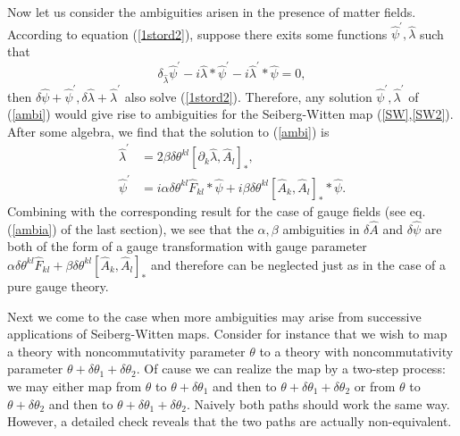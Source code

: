 \documentclass[a4paper,a4paper]{article}%
\begin{document}
Now let us consider the ambiguities arisen in the presence of matter fields.
According to equation (\ref{1stord2}), suppose there exits some functions
$\hat{\psi}^{\prime},\hat{\lambda}$ such that
\begin{equation}
\delta_{\hat{\lambda}}\hat{\psi}^{\prime}-i\hat{\lambda}\ast\hat{\psi}%
^{\prime}-i\hat{\lambda}^{\prime}\ast\hat{\psi}=0, \label{ambi}%
\end{equation}
then $\delta\hat{\psi}+\hat{\psi}^{\prime},\delta\hat{\lambda}+\hat{\lambda
}^{\prime}$ also solve (\ref{1stord2}). Therefore, any solution $\hat{\psi
}^{\prime},\hat{\lambda}^{\prime}$ of (\ref{ambi}) would give rise to
ambiguities for the Seiberg-Witten map (\ref{SW},\ref{SW2}). After some
algebra, we find that the solution to (\ref{ambi}) is%
\begin{align*}
\hat{\lambda}^{\prime}  &  =2\beta\delta\theta^{kl}[\partial_{k}\hat{\lambda
},\hat{A}_{l}]_{\ast},\\
\hat{\psi}^{\prime}  &  =i\alpha\delta\theta^{kl}\hat{F}_{kl}\ast\hat{\psi
}+i\beta\delta\theta^{kl}[\hat{A}_{k},\hat{A}_{l}]_{\ast}\ast\hat{\psi}.
\end{align*}
Combining with the corresponding result for the case of gauge fields (see eq.
(\ref{ambia}) of the last section), we see that the $\alpha,\beta$ ambiguities
in $\delta\hat{A}$ and $\delta\hat{\psi}$ are both of the form of a gauge
transformation with gauge parameter $\alpha\delta\theta^{kl}\hat{F}_{kl}%
+\beta\delta\theta^{kl}[\hat{A}_{k},\hat{A}_{l}]_{\ast}$ and therefore can be
neglected just as in the case of a pure gauge theory.

Next we come to the case when more ambiguities may arise from successive
applications of Seiberg-Witten maps. Consider for instance that we wish to map
a theory with noncommutativity parameter $\theta$ to a theory with
noncommutativity parameter $\theta+\delta\theta_{1}+\delta\theta_{2}$. Of
cause we can realize the map by a two-step process: we may either map from
$\theta$ to $\theta+\delta\theta_{1}$ and then to $\theta+\delta\theta
_{1}+\delta\theta_{2}$ or from $\theta$ to $\theta+\delta\theta_{2}$ and then
to $\theta+\delta\theta_{1}+\delta\theta_{2}$. Naively both paths should work
the same way. However, a detailed check reveals that the two paths are
actually non-equivalent.
\end{document}
